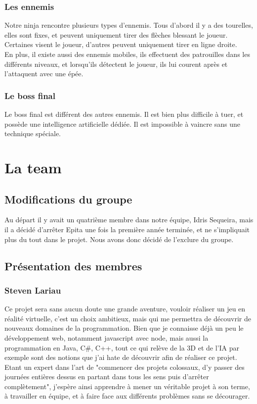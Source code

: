 \documentclass[12pt]{article}
\begin{document}
\subsubsection{Les ennemis}

Notre ninja rencontre plusieurs types d'ennemis. Tous d'abord il y a des tourelles, elles sont fixes, et peuvent uniquement tirer des flèches blessant le joueur. Certaines visent le joueur, d'autres peuvent uniquement tirer en ligne droite.\\
En plus, il existe aussi des ennemis mobiles, ils effectuent des patrouilles dans les différents niveaux, et lorsqu'ils détectent le joueur, ils lui courent après et l'attaquent avec une épée.

\subsubsection{Le boss final}

Le boss final est différent des autres ennemis. Il est bien plus difficile à tuer, et possède une intelligence artificielle dédiée. Il est impossible à vaincre sans une technique spéciale.

\section{La team}

\subsection{Modifications du groupe}

Au départ il y avait un quatrième membre dans notre équipe, Idris Sequeira, mais il a décidé d'arrêter Epita une fois la première année terminée, et ne s'impliquait plus du tout dans le projet. Nous avons donc décidé de l'exclure du groupe.

\subsection{Présentation des membres}

\subsubsection{Steven Lariau}

Ce projet sera sans aucun doute une grande aventure, vouloir réaliser un jeu en réalité virtuelle, c'est un choix ambitieux, mais qui me permettra de découvrir de nouveaux domaines de la programmation. Bien que je connaisse déjà un peu le développement web, notamment javascript avec node, mais aussi la programmation en Java, C\#, C++, tout ce qui relève de la 3D et de l'IA par exemple sont des notions que j'ai hate de découvrir afin de réaliser ce projet.
Etant un expert dans l'art de "commencer des projets colossaux, d'y passer des journées entières dessus en partant dans tous les sens puis d'arrêter complètement", j'espère ainsi apprendre à mener un véritable projet à son terme, à travailler en équipe, et à faire face aux différents problèmes sans se décourager.
\end{document}
